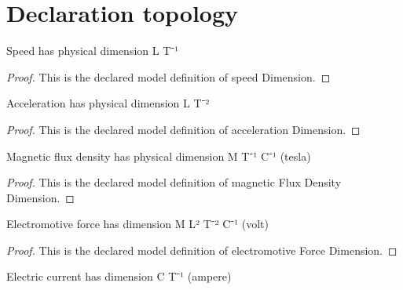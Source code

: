 \section{Declaration topology}
\begin{definition}
  \label{def:physics:phyx-mini-0977:phyxminiproblems-problemphyxmini0977-speeddimension}
  Speed has physical dimension L T⁻¹
\end{definition}
\begin{proof}
  This is the declared model definition of speed Dimension.
\end{proof}
\begin{definition}
  \label{def:physics:phyx-mini-0977:phyxminiproblems-problemphyxmini0977-accelerationdimension}
  Acceleration has physical dimension L T⁻²
\end{definition}
\begin{proof}
  This is the declared model definition of acceleration Dimension.
\end{proof}
\begin{definition}
  \label{def:physics:phyx-mini-0977:phyxminiproblems-problemphyxmini0977-magneticfluxdensitydimension}
  Magnetic flux density has physical dimension M T⁻¹ C⁻¹ (tesla)
\end{definition}
\begin{proof}
  This is the declared model definition of magnetic Flux Density Dimension.
\end{proof}
\begin{definition}
  \label{def:physics:phyx-mini-0977:phyxminiproblems-problemphyxmini0977-electromotiveforcedimension}
  Electromotive force has dimension M L² T⁻² C⁻¹ (volt)
\end{definition}
\begin{proof}
  This is the declared model definition of electromotive Force Dimension.
\end{proof}
\begin{definition}
  \label{def:physics:phyx-mini-0977:phyxminiproblems-problemphyxmini0977-electriccurrentdimension}
  Electric current has dimension C T⁻¹ (ampere)
\end{definition}
